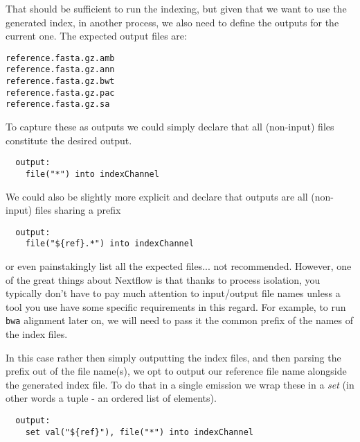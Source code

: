 That should be sufficient to run the indexing, but given that we want to use the generated index,
in another process, we also need to define the outputs for the current one. 
The expected output files are:

\begin{lstlisting}
reference.fasta.gz.amb
reference.fasta.gz.ann
reference.fasta.gz.bwt
reference.fasta.gz.pac
reference.fasta.gz.sa
\end{lstlisting}

To capture these as outputs we could simply declare that all (non-input)
files constitute the desired output.

\begin{lstlisting}
  output:
    file("*") into indexChannel 
\end{lstlisting}

We could also be slightly more explicit and declare that outputs are all (non-input)
files sharing a prefix

\begin{lstlisting}
  output:
    file("${ref}.*") into indexChannel 
\end{lstlisting}

or even painstakingly list all the expected files... not recommended.
%
%
%
However, one of the great things about Nextflow is that thanks to process isolation, 
you typically don't have to pay much attention to input/output file names 
unless a tool you use have some specific requirements in this regard.
For example, to run \texttt{bwa} alignment later on, we will need to pass it 
the common prefix of the names of the index files. 

In this case rather then simply outputting the index files,
and then parsing the prefix out of the file name(s), 
we opt to output our reference file name alongside the generated index file.
To do that in a single emission we wrap these in a \emph{set} 
(in other words a tuple - an ordered list of elements).

\begin{lstlisting}
  output:
    set val("${ref}"), file("*") into indexChannel 
\end{lstlisting}

